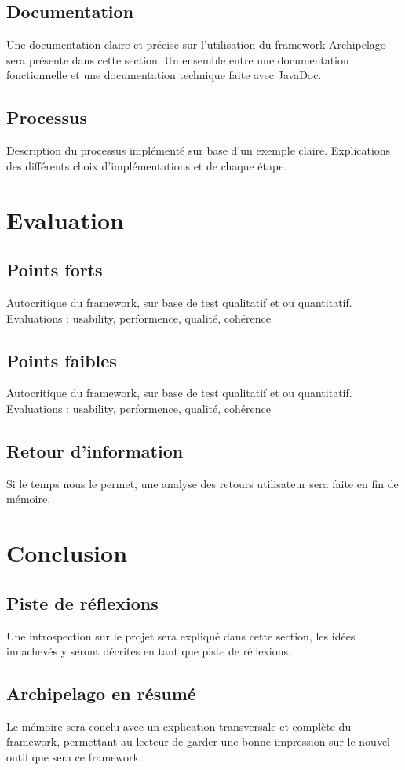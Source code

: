 \documentclass[a4paper,fleqn,12pt]{report}
\begin{document}
\section{Documentation}
Une documentation claire et précise sur l'utilisation du framework Archipelago sera présente dans cette section. Un ensemble entre une documentation fonctionnelle et une documentation technique faite avec JavaDoc.
\section{Processus}
Description du processus implémenté sur base d'un exemple claire. Explications des différents choix d'implémentations et de chaque étape.
\chapter{Evaluation}
\section{Points forts}
Autocritique du framework, sur base de test qualitatif et ou quantitatif. Evaluations : usability, performence, qualité, cohérence
\section{Points faibles}
Autocritique du framework, sur base de test qualitatif et ou quantitatif.
Evaluations : usability, performence, qualité, cohérence
\section{Retour d'information}
Si le temps nous le permet, une analyse des retours utilisateur sera faite en fin de mémoire.
\chapter{Conclusion}
\section{Piste de réflexions}
Une introspection sur le projet sera expliqué dans cette section, les idées innachevés y seront décrites en tant que piste de réflexions.
\section{Archipelago en résumé}
Le mémoire sera conclu avec un explication transversale et complète du framework, permettant au lecteur de garder une bonne impression sur le nouvel outil que sera ce framework.
\end{document}
